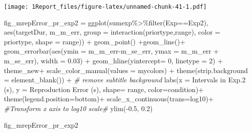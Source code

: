 \documentclass[
]{article}
\newenvironment{Shaded}{\begin{snugshade}}{\end{snugshade}}
\newcommand{\AttributeTok}[1]{\textcolor[rgb]{0.77,0.63,0.00}{#1}}
\newcommand{\CommentTok}[1]{\textcolor[rgb]{0.56,0.35,0.01}{\textit{#1}}}
\newcommand{\DecValTok}[1]{\textcolor[rgb]{0.00,0.00,0.81}{#1}}
\newcommand{\FloatTok}[1]{\textcolor[rgb]{0.00,0.00,0.81}{#1}}
\newcommand{\FunctionTok}[1]{\textcolor[rgb]{0.00,0.00,0.00}{#1}}
\newcommand{\NormalTok}[1]{#1}
\newcommand{\OtherTok}[1]{\textcolor[rgb]{0.56,0.35,0.01}{#1}}
\newcommand{\SpecialCharTok}[1]{\textcolor[rgb]{0.00,0.00,0.00}{#1}}
\newcommand{\StringTok}[1]{\textcolor[rgb]{0.31,0.60,0.02}{#1}}
\begin{document}
\texttt{[image: 1Report\_files/figure-latex/unnamed-chunk-41-1.pdf]}

\begin{Shaded}
\begin{Highlighting}[]
\NormalTok{fig\_mrepError\_pr\_exp2 }\OtherTok{=} \FunctionTok{ggplot}\NormalTok{(sumexp}\SpecialCharTok{\%\textgreater{}\%}\FunctionTok{filter}\NormalTok{(Exp}\SpecialCharTok{==}\StringTok{\textquotesingle{}Exp2\textquotesingle{}}\NormalTok{),}
                          \FunctionTok{aes}\NormalTok{(targetDur, }
\NormalTok{                              m\_m\_err, }
                              \AttributeTok{group =} \FunctionTok{interaction}\NormalTok{(priortype,range),}
                              \AttributeTok{color =}\NormalTok{ priortype,}
                              \AttributeTok{shape =}\NormalTok{ range)) }\SpecialCharTok{+} 
  \FunctionTok{geom\_point}\NormalTok{() }\SpecialCharTok{+}\FunctionTok{geom\_line}\NormalTok{()}\SpecialCharTok{+}
  \FunctionTok{geom\_errorbar}\NormalTok{(}\FunctionTok{aes}\NormalTok{(}\AttributeTok{ymin =}\NormalTok{ m\_m\_err}\SpecialCharTok{{-}}\NormalTok{m\_se\_err, }\AttributeTok{ymax =}\NormalTok{ m\_m\_err }\SpecialCharTok{+}\NormalTok{ m\_se\_err), }\AttributeTok{width =} \FloatTok{0.03}\NormalTok{) }\SpecialCharTok{+} 
  \FunctionTok{geom\_hline}\NormalTok{(}\AttributeTok{yintercept=} \DecValTok{0}\NormalTok{, }\AttributeTok{linetype =} \DecValTok{2}\NormalTok{) }\SpecialCharTok{+}
\NormalTok{  theme\_new}\SpecialCharTok{+} 
  \FunctionTok{scale\_color\_manual}\NormalTok{(}\AttributeTok{values =}\NormalTok{ mycolors) }\SpecialCharTok{+}
  \FunctionTok{theme}\NormalTok{(}\AttributeTok{strip.background =} \FunctionTok{element\_blank}\NormalTok{()) }\SpecialCharTok{+} \CommentTok{\# remove subtitle background}
  \FunctionTok{labs}\NormalTok{(}\AttributeTok{x =} \StringTok{\textquotesingle{}Intervals in Exp.2 (s)\textquotesingle{}}\NormalTok{, }\AttributeTok{y =} \StringTok{\textquotesingle{}Reproduction Error (s)\textquotesingle{}}\NormalTok{, }\AttributeTok{shape=} \StringTok{\textquotesingle{}range\textquotesingle{}}\NormalTok{, }\AttributeTok{color=}\StringTok{\textquotesingle{}condition\textquotesingle{}}\NormalTok{)}\SpecialCharTok{+} \FunctionTok{theme}\NormalTok{(}\AttributeTok{legend.position=}\StringTok{\textquotesingle{}bottom\textquotesingle{}}\NormalTok{)}\SpecialCharTok{+}
  \FunctionTok{scale\_x\_continuous}\NormalTok{(}\AttributeTok{trans=}\StringTok{\textquotesingle{}log10\textquotesingle{}}\NormalTok{)}\SpecialCharTok{+} \CommentTok{\#Transform x axis to log10 scale\#}
  \FunctionTok{ylim}\NormalTok{(}\SpecialCharTok{{-}}\FloatTok{0.5}\NormalTok{, }\FloatTok{0.2}\NormalTok{)}

\NormalTok{fig\_mrepError\_pr\_exp2}
\end{Highlighting}
\end{Shaded}
\end{document}
